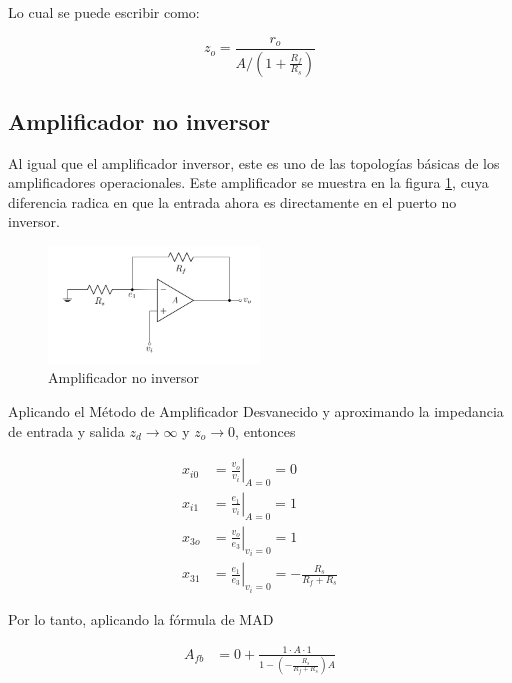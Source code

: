 Lo cual se puede escribir como:

\begin{equation}
\boxed{z_o = \frac{r_o}{A / \left( 1 + \frac{R_f}{R_s} \right)}}
\end{equation}

\subsection{Amplificador no inversor}

Al igual que el amplificador inversor, este es uno de las topologías básicas de los amplificadores operacionales. Este amplificador se muestra en la figura \ref{fig:mt-amp-no-inversor}, cuya diferencia radica en que la entrada ahora es directamente en el puerto no inversor.

\begin{figure}[ht]
    \centering
    \includegraphics[width=0.5\textwidth]{src/images/amp-no-inversor.png}
    \caption{Amplificador no inversor}
    \label{fig:mt-amp-no-inversor}
\end{figure}

Aplicando el Método de Amplificador Desvanecido y aproximando la impedancia de entrada y salida $z_d \rightarrow \infty$ y $z_o \rightarrow 0$, entonces

\begin{align}
x_{i0} &= \left. \frac{v_o}{v_i} \right|_{A=0} = 0 \\
x_{i1} &= \left. \frac{e_1}{v_i} \right|_{A=0} = 1 \\
x_{3o} &= \left. \frac{v_o}{e_3} \right|_{v_i=0} = 1 \\
x_{31} &= \left. \frac{e_1}{e_3} \right|_{v_i=0} = -\frac{R_s}{R_f + R_s}
\end{align}


Por lo tanto, aplicando la fórmula de MAD

\begin{align*}
A_{fb} &= 0 + \frac{1 \cdot A \cdot 1}{1 - \left( -\frac{R_s}{R_f + R_s} \right) A} \\
\end{align*}

